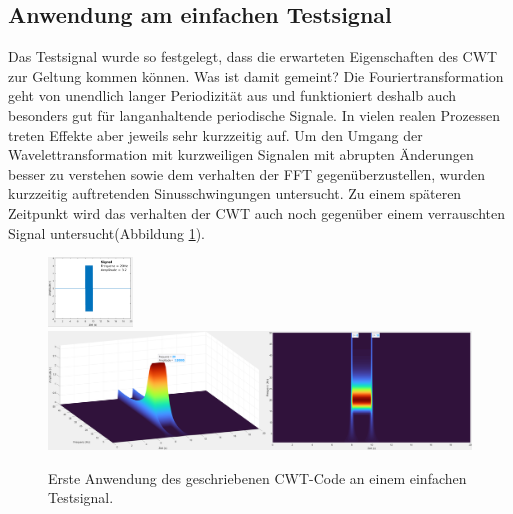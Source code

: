\subsection{Anwendung am einfachen Testsignal
	\label{wavelets:subsection:ErsteAnwendung}}
Das Testsignal wurde so festgelegt, dass die erwarteten Eigenschaften des CWT zur Geltung kommen können. Was ist damit gemeint? Die Fouriertransformation geht von unendlich langer Periodizität aus und funktioniert deshalb auch besonders gut für langanhaltende periodische Signale. In vielen realen Prozessen treten Effekte aber jeweils sehr kurzzeitig auf. Um den Umgang der Wavelettransformation mit kurzweiligen Signalen mit abrupten Änderungen besser zu verstehen sowie dem verhalten der FFT gegenüberzustellen, wurden kurzzeitig auftretenden Sinusschwingungen untersucht. Zu einem späteren Zeitpunkt wird das verhalten der CWT auch noch gegenüber einem verrauschten Signal untersucht(Abbildung \ref{wavelet:fig:ErsteAnwendung}).

\begin{figure}
	\centering
	\includegraphics[width=0.2\textwidth]{papers/wavelets/images/8_BC_Signal.png}
	\includegraphics[width=\textwidth]{papers/wavelets/images/12-2_CWT-1Prog.png}
	\caption{Erste Anwendung des geschriebenen CWT-Code an einem einfachen Testsignal.}
	\label{wavelet:fig:ErsteAnwendung}
\end{figure}
